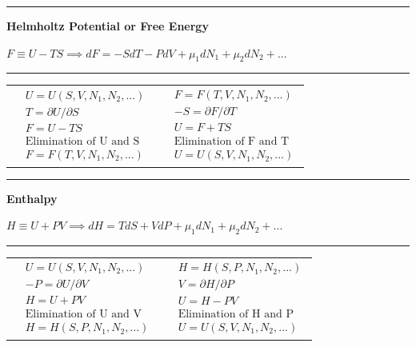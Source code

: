 \begin{center}
    \rule{.8\textwidth}{.5pt}
    
    \textbf{Helmholtz Potential or Free Energy}
    
    $F \equiv U - TS \implies dF = -SdT - PdV + \mu_1dN_1 + \mu_2dN_2 + ... $
    \rule{.8\textwidth}{.5pt}
\end{center}
\begin{tabularx}{\textwidth}{X | X}
    {\begin{align*}
        & U = U(S,V,N_1,N_2,...) \\
        & T = \partial U/\partial S \\
        & F = U - TS \\
        & \text{Elimination of U and S} \\
        & F = F(T,V,N_1,N_2,...)
    \end{align*}} 
    & 
    {\begin{align*}
        & F=F(T,V,N_1,N_2,...) \\
        & -S = \partial F/\partial T \\
        & U = F + TS \\
        & \text{Elimination of F and T} \\
        & U = U(S,V,N_1,N_2,...)
    \end{align*}} 
\end{tabularx}
\begin{center}
    \rule{.8\textwidth}{.5pt}
    
    \textbf{Enthalpy}
    
    $H \equiv U + PV \implies dH = TdS + VdP + \mu_1dN_1 + \mu_2dN_2 + ... $
    \rule{.8\textwidth}{.5pt}
\end{center}
\begin{tabularx}{\textwidth}{X | X}
    {\begin{align*}
        & U = U(S,V,N_1,N_2,...) \\
        & -P = \partial U/\partial V \\
        & H = U + PV \\
        & \text{Elimination of U and V} \\
        & H = H(S,P,N_1,N_2,...)
    \end{align*}} 
    & 
    {\begin{align*}
        & H=H(S,P,N_1,N_2,...) \\
        & V = \partial H/\partial P \\
        & U = H - PV \\
        & \text{Elimination of H and P} \\
        & U = U(S,V,N_1,N_2,...)
    \end{align*}} 
\end{tabularx}
